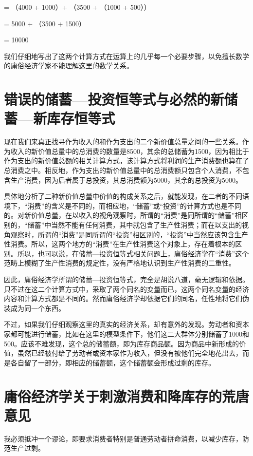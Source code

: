 \documentclass[a4paper]{ctexart}
\begin{document}
= （4000 + 1000）+ （3500 + （1000 + 500））

= 5000 + （3500 + 1500）

= 10000

我们仔细地写出了这两个计算方式在运算上的几乎每一个必要步骤，以免擅长数学的庸俗经济学家不能理解这里的数学关系。

\section{错误的储蓄—投资恒等式与必然的新储蓄—新库存恒等式}

现在我们来真正找寻作为收入的和作为支出的二个新价值总量之间的一些关系。作为收入的新价值总量中的总消费的数量是8500，其余的总储蓄为1500，因为相比于作为支出的新价值总额的相关计算方式，该计算方式将利润的生产消费额也算在了总消费之中。相反地，作为支出的新价值总量中的总消费额只包含个人消费，不包含生产消费，因为后者属于总投资，其总消费额为5000，其余的总投资为5000。

具体地分析了二种新价值总量中价值的构成关系之后，就能发现，在二者的不同语境下，“消费”的含义是不同的，而相应地，“储蓄”或“投资”的计算方式也是不同的。对新价值总量，在以收入的视角观察时，所谓的“消费”是同所谓的“储蓄”相区别的，“储蓄”中当然不能有任何消费，其中就包含了生产性消费；而在以支出的视角观察时，所谓的“消费”是同所谓的“投资”相区别的，“投资”中当然应该包含生产性消费。所以，这两个地方的“消费”在生产性消费这个对象上，存在着根本的区别。所以，也可以说，在储蓄—投资恒等式相关问题上，庸俗经济学在“消费”这个范畴上模糊了生产性消费的规定性，没有严格地认识到生产性消费的二重性。

因此，庸俗经济学所谓的储蓄—投资恒等式，完全是胡说八道，毫无逻辑和依据。只不过在这二个计算方式中，采取了两个同名的变量而已，这两个同名变量的经济内容和计算方式都是不同的。然而庸俗经济学却依据它们的同名，任性地将它们伪装成为同一个东西。

不过，如果我们仔细观察这里的真实的经济关系，却有意外的发现。劳动者和资本家都可能进行储蓄，比如在这里的模型条件下，他们这二大群体分别储蓄了1000和500。应该不难发现，这个总的储蓄额，即为库存商品额。因为商品中新形成的价值，虽然已经被付给了劳动者或资本家作为收入，但没有被他们完全地花出去，而是各自留了一部分，即相应的储蓄额，这个储蓄额会形成过剩的库存。

\section{庸俗经济学关于刺激消费和降库存的荒唐意见}

我必须抵冲一个谬论，即要求消费者特别是普通劳动者拼命消费，以减少库存，防范生产过剩。
\end{document}
